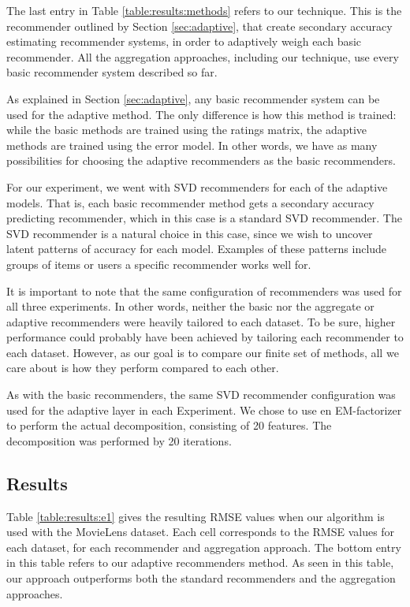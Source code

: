 The last entry in Table \ref{table:results:methods}
refers to our technique. 
This is the recommender outlined by Section \ref{sec:adaptive},
that create secondary accuracy estimating recommender systems,
in order to adaptively weigh each basic recommender.
All the aggregation approaches, including our technique,
use every basic recommender system described so far.

As explained in Section \ref{sec:adaptive},
any basic recommender system can be used for the adaptive method.
The only difference is how this method is trained:
while the basic methods are trained using the ratings matrix,
the adaptive methods are trained using the error model.
In other words, we have as many possibilities for choosing
the adaptive recommenders as the basic recommenders.

For our experiment, we went with SVD recommenders
for each of the adaptive models.
That is, each basic recommender method gets a secondary 
accuracy predicting recommender, which in this case is a 
standard SVD recommender.
The SVD recommender is a natural choice in this case,
since we wish to uncover latent patterns of accuracy
for each model.
Examples of these patterns include groups of items
or users a specific recommender works well for.

It is important to note that the same configuration of recommenders was used for all three experiments.
In other words, neither the basic nor the aggregate or adaptive recommenders were heavily tailored
to each dataset. To be sure, higher performance could probably have been achieved
by tailoring each recommender to each dataset. However,
as our goal is to compare our finite set of methods, all we care 
about is how they perform compared to each other.

As with the basic recommenders, the same SVD recommender configuration was used 
for the adaptive layer in each Experiment.
We chose to use en EM-factorizer to perform the actual decomposition,
consisting of 20 features. The decomposition was performed by 20 iterations.


\subsection{Results}

Table \ref{table:results:e1} gives the resulting RMSE values when our algorithm is used with the MovieLens dataset.
Each cell corresponds to the RMSE values for each dataset,
for each recommender and aggregation approach.
The bottom entry in this table refers to our adaptive recommenders method.
As seen in this table, our approach outperforms both the standard recommenders
and the aggregation approaches.


